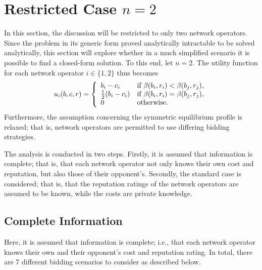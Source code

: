 \section{Restricted Case $n=2$} %
\label{sec:direct_restricted_case_n_2_direct}
In this section, the discussion will be restricted to only two network operators. Since the problem in its generic form proved analytically intractable to be solved analytically, this section will explore whether in a much simplified scenario it is possible to find a closed-form solution. To this end, let $n=2$. The utility function for each network operator $i\in \{1, 2\}$ thus becomes
\begin{equation}
	\label{eq:utility_n_2_direct}
	u_i(b,c,r) = \left\{
	\begin{array}{l l}
		b_i - c_i &\text{if } \beta(b_i,r_i) < \beta(b_j,r_j),\\
		\frac{1}{2}(b_i - c_i) &\text{if } \beta(b_i,r_i) = \beta(b_j,r_j),\\
		0 &\text{otherwise}.
	\end{array}\right.
\end{equation}
Furthermore, the assumption concerning the symmetric equilibrium profile is relaxed; that is, network operators are permitted to use differing bidding strategies.

The analysis is conducted in two steps. Firstly, it is assumed that information is complete; that is, that each network operator not only knows their own cost and reputation, but also those of their opponent's. Secondly, the standard case is considered; that is, that the reputation ratings of the network operators are assumed to be known, while the costs are private knowledge.

\subsection{Complete Information} %
\label{sub:complete_information_n_2_direct}
Here, it is assumed that information is complete; i.e., that each network operator knows their own and their opponent's cost and reputation rating. In total, there are 7 different bidding scenarios to consider as described below.

